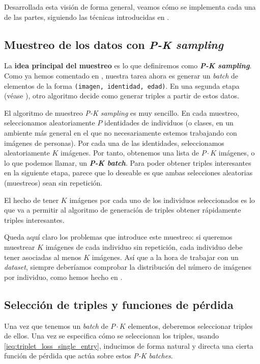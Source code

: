 Desarrollada esta visión de forma general, veamos cómo se implementa cada una de las partes, siguiendo las técnicas introducidas en \cite{informatica:principal}.

\subsection{Muestreo de los datos con \textit{P-K sampling}}

La \textbf{idea principal del muestreo} es lo que definiremos como \textbf{\textit{P-K sampling}}. Como ya hemos comentado en , nuestra tarea ahora es generar un \textit{batch} de elementos de la forma \lstinline{(imagen, identidad, edad)}. En una segunda etapa (véase ), otro algoritmo decide como generar triples a partir de estos datos.

El algoritmo de muestreo \textit{P-K sampling} es muy sencillo. En cada muestreo, seleccionamos aleatoriamente $P$ identidades de individuos (o clases, en un ambiente más general en el que no necesariamente estemos trabajando con imágenes de personas). Por cada una de las identidades, seleccionamos aleatoriamente $K$ imágenes. Por tanto, obtenemos una lista de $P \cdot K$ imágenes, o lo que podemos llamar, un \textbf{\textit{P-K batch}}. Para poder obtener triples interesantes en la siguiente etapa, parece que lo deseable es que ambas selecciones aleatorias (muestreos) sean sin repetición.

El hecho de tener $K$ imágenes por cada uno de los individuos seleccionados es lo que va a permitir al algoritmo de generación de triples obtener rápidamente triples interesantes.

Queda aquí claro los problemas que introduce este muestreo: si queremos muestrear $K$ imágenes de cada individuo sin repetición, cada individuo debe tener asociadas al menos $K$ imágenes. Así que a la hora de trabajar con un \textit{dataset}, siempre deberíamos comprobar la distribución del número de imágenes por individuo, como hemos hecho en .

\subsection{Selección de triples y funciones de pérdida} \label{isubs:seleccion_de_triples}

Una vez que tenemos un \textit{batch} de $P \cdot K$ elementos, deberemos seleccionar triples de ellos. Una vez se especifica cómo se seleccionan los triples, usando \eqref{ieq:triplet_loss_single_entry}, inducimos de forma natural y directa una cierta función de pérdida que actúa sobre estos \textit{P-K batches}.

